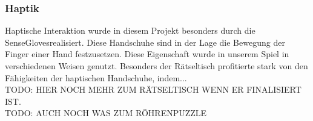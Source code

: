 \subsubsection{Haptik}
Haptische Interaktion wurde in diesem Projekt besonders durch die \dq SenseGloves\dq realisiert. Diese Handschuhe sind in der Lage die Bewegung der Finger einer Hand festzusetzen. Diese Eigenschaft wurde in unserem Spiel in verschiedenen Weisen genutzt. Besonders der Rätseltisch profitierte stark von den Fähigkeiten der haptischen Handschuhe, indem...\\

TODO: HIER NOCH MEHR ZUM RÄTSELTISCH WENN ER FINALISIERT IST.\\

TODO: AUCH NOCH WAS ZUM RÖHRENPUZZLE